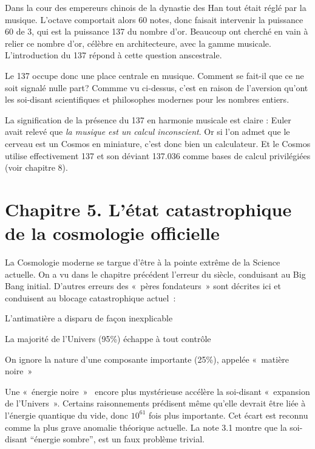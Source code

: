 \documentclass[a4paper,12pt]{article}
\begin{document}
Dans la cour des empereurs chinois de la dynastie des Han tout était réglé par la musique. L'octave comportait alors 60 notes, donc faisait intervenir la puissance 60 de 3, qui est la puissance 137 du nombre d'or. Beaucoup ont cherché en vain à relier ce nombre d'or, célèbre en architecteure, avec la gamme musicale. L'introduction du 137 répond à cette question anscestrale.


Le 137 occupe donc une place centrale en musique. Comment se fait-il que ce ne soit signalé nulle part? Commme vu ci-dessus, c'est en raison de l'aversion qu'ont les soi-disant scientifiques et philosophes modernes pour les nombres entiers. 


La signification de la présence du 137 en harmonie musicale est claire : Euler avait relevé que \textit{la musique est un calcul inconscient}. Or si l'on admet que le cerveau est un Cosmos en miniature, c'est donc bien un calculateur. Et le Cosmos utilise effectivement 137 et son déviant 137.036 comme bases de calcul privilégiées (voir chapitre 8).
   











\section{Chapitre 5. L'état catastrophique de la cosmologie officielle}

La Cosmologie moderne se targue d'être à la pointe extr\^eme de la Science actuelle. On a vu dans le chapitre précédent l’erreur du siècle, conduisant au Big Bang initial. D’autres erreurs des « pères fondateurs » sont décrites ici  et conduisent au blocage catastrophique actuel :

L'antimatière a disparu de façon inexplicable

La majorité de l’Univers (95\%) échappe à tout contrôle

On ignore la nature d’une composante importante (25\%), appelée « matière noire »

Une « énergie noire »  encore plus mystérieuse accélère la soi-disant « expansion de l’Univers ». Certains raisonnements prédisent  même qu’elle devrait être liée à l’énergie quantique du vide, donc $10^{61}$ fois plus importante. Cet écart est reconnu comme la plus grave anomalie théorique actuelle.
La note 3.1 montre que la soi-disant ``énergie sombre'', est un faux problème trivial. 
\end{document}
